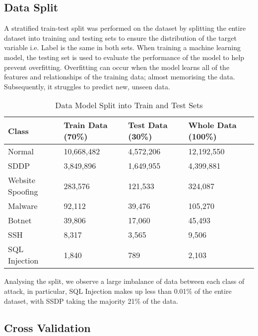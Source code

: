 \subsection{Data Split}

A stratified train-test split was performed on the dataset by splitting the entire dataset into training and testing sets to ensure the distribution of the target variable i.e. Label is the same in both sets. When training a machine learning model, the testing set is used to evaluate the performance of the model to help prevent overfitting. Overfitting can occur when the model learns all of the features and relationships of the training data; almost memorising the data. Subsequently, it struggles to predict new, unseen data.

\begin{table}[H]
\begin{tabular}{llll}
\textbf{Class}   & \textbf{Train Data (70\%)} & \textbf{Test Data (30\%)} & \textbf{Whole Data (100\%)} \\ \hline
Normal           & 10,668,482                       &   4,572,206           & 12,192,550                  \\
SDDP             & 3,849,896                &     1,649,955            & 4,399,881                   \\
Website Spoofing & 283,576            &     121,533       & 324,087                     \\
Malware          &  92,112                     &     39,476               & 105,270                     \\
Botnet           & 39,806                    &     17,060          & 45,493                      \\
SSH              & 8,317              &       3,565             & 9,506                       \\
SQL Injection    & 1,840                &     789                  & 2,103                  \\ \hline
\end{tabular}
\caption{Data Model Split into Train and Test Sets}
\label{tab:split_data}
\end{table}

Analysing the split, we observe a large imbalance of data between each class of attack, in particular, SQL Injection makes up less than 0.01\% of the entire dataset, with SSDP taking the majority 21\% of the data. 


\subsection{Cross Validation}


